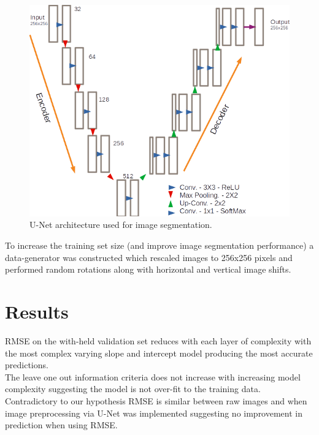 \documentclass[isoft]{poster_class_UofC}
\begin{document}
\begin{poster}
                \vspace{1cm}
        \begin{figure}
                    \centering
            \captionsetup{type=figure}
            \includegraphics[scale=1]{./images/UNet_Arch.png}
            \caption{U-Net architecture used for image segmentation.}
            \label{fig:U-NET}
        \end{figure}
              \vspace{1cm}
              
To increase the training set size (and improve image segmentation performance) a data-generator was constructed which rescaled images to 256x256 pixels and performed random rotations along with horizontal and vertical image shifts.


        \section{Results}%
RMSE on the with-held validation set reduces with each layer of complexity with the most complex varying slope and intercept model producing the most accurate predictions. \\

The leave one out information criteria \cite{VehtariAki2017PBme} does not increase with increasing model complexity suggesting the model is not over-fit to the training data. \\

Contradictory to our hypothesis RMSE is similar between raw images and when image preprocessing via U-Net was implemented suggesting no improvement in prediction when using RMSE.


\end{poster}
\end{document}

